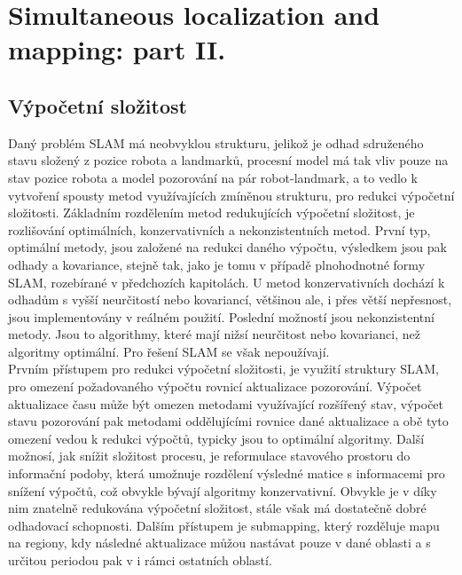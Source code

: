 \documentclass[11pt]{article}
\begin{document}
\section{Simultaneous localization and mapping: part II.}
\subsection{Výpočetní složitost}
Daný problém SLAM má neobvyklou strukturu, jelikož je odhad sdruženého stavu složený z pozice robota a landmarků, procesní model má tak vliv pouze na stav pozice robota a model pozorování na pár robot-landmark, a to vedlo k vytvoření spousty metod využívajících zmíněnou strukturu, pro redukci výpočetní složitosti. Základním rozdělením metod redukujících výpočetní složitost, je rozlišování optimálních, konzervativních a nekonzistentních metod. První typ, optimální metody, jsou založené na redukci daného výpočtu, výsledkem jsou pak odhady a kovariance, stejně tak, jako je tomu v případě plnohodnotné formy SLAM, rozebírané v předchozích kapitolách. U metod konzervativních dochází k odhadům s vyšší neurčitostí nebo kovariancí, většinou ale, i přes větší nepřesnost, jsou implementovány v reálném použití. Poslední možností jsou nekonzistentní metody. Jsou to algorithmy, které mají nižsí neurčitost nebo kovarianci, než algoritmy optimální. Pro řešení SLAM se však nepoužívají.\\
\indent Prvním přístupem pro redukci výpočetní složitosti, je využití struktury SLAM, pro omezení požadovaného výpočtu rovnicí aktualizace pozorování. Výpočet aktualizace času může být omezen metodami využívající rozšířený stav, výpočet stavu pozorování pak metodami oddělujícími rovnice dané aktualizace a obě tyto omezení vedou k redukci výpočtů, typicky jsou to optimální algoritmy. Další možnosí, jak snížit složitost procesu, je reformulace stavového prostoru do informační podoby, která umožnuje rozdělení výsledné matice s informacemi pro snížení výpočtů, což obvykle bývají algoritmy konzervativní. Obvykle je v díky nim znatelně redukována výpočetní složitost, stále však má dostatečně dobré odhadovací schopnosti. Dalším přístupem je submapping, který rozděluje mapu na regiony, kdy následné aktualizace můžou nastávat pouze v dané oblasti a s určitou periodou pak v i rámci ostatních oblastí. 
\end{document}
